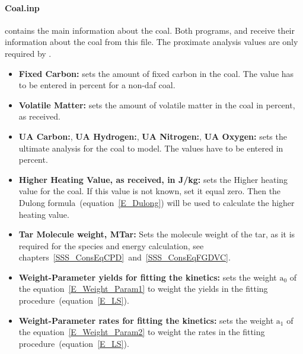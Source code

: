 \paragraph{Coal.inp} contains the main information about the coal. Both programs, \CPD and \FGDVC receive their information about the coal from this file. The proximate analysis values are only required by \CPD.
\begin{itemize}
 \item \textbf{Fixed Carbon:} sets the amount of fixed carbon in the coal. The value has to be entered in percent for a non-daf coal.
 \item \textbf{Volatile Matter:} sets the amount of volatile matter in the coal in percent, as received.
 \item \textbf{UA Carbon:}, \textbf{UA Hydrogen:}, \textbf{UA Nitrogen:}, \textbf{UA Oxygen:} sets the ultimate analysis for the coal to model. The values have to be entered in percent.
 \item \textbf{Higher Heating Value, as received, in J/kg:} sets the Higher heating value for the coal. If this value is not known, set it equal zero. Then the Dulong formula~(equation~\ref{E_Dulong}) will be used to calculate the higher heating value.
 \item \textbf{Tar Molecule weight, MTar:} Sets the molecule weight of the tar, as it is required for the species and energy calculation, see chapters~\ref{SSS_ConsEqCPD}~and~\ref{SSS_ConsEqFGDVC}.
 \item \textbf{Weight-Parameter yields for fitting the kinetics:} sets the weight $\mathrm{a_0}$ of the equation~\ref{E_Weight_Param1} to weight the yields in the fitting procedure~(equation~\ref{E_LS}).
 \item \textbf{Weight-Parameter rates for fitting the kinetics:}  sets the weight $\mathrm{a_1}$ of the equation~\ref{E_Weight_Param2} to weight the rates in the fitting procedure~(equation~\ref{E_LS}).
\end{itemize}


